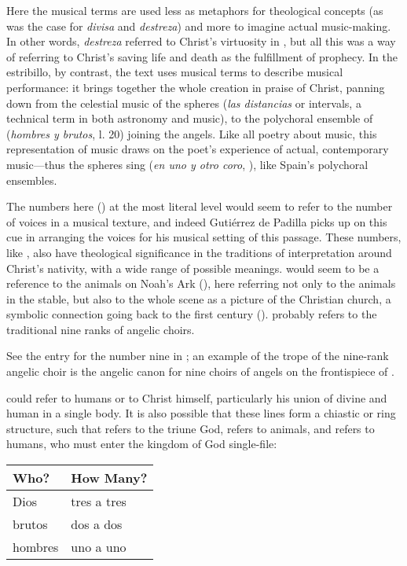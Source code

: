Here the musical terms are used less as metaphors for theological concepts (as
was the case for \emph{divisa} and \emph{destreza}) and more to imagine actual
music-making.
In other words, \emph{destreza} referred to Christ's virtuosity in
, but all this was a way of
referring to Christ's saving life and death as the fulfillment of prophecy.
In the estribillo, by contrast, the text uses musical terms to describe musical
performance: it brings together the whole creation in praise of Christ, panning
down from the celestial music of the spheres (\emph{las distancias} or
intervals, a technical term in both astronomy and music), to the polychoral
ensemble of  (\emph{hombres y brutos}, l. 20) joining the
angels.
Like all poetry about music, this representation of music draws on the poet's
experience of actual, contemporary music---thus the spheres sing  (\emph{en uno y otro coro}, ), like Spain's
polychoral ensembles.

The numbers here () at the most
literal level would seem to refer to the number of voices in a musical texture,
and indeed Gutiérrez de Padilla picks up on this cue in arranging the voices for
his musical setting of this passage.
These numbers, like , also have theological
significance in the traditions of interpretation around Christ's nativity, with
a wide range of possible meanings.
 would seem to be a reference to the animals on Noah's Ark
(), here referring not only to the animals in the stable, but
also to the whole scene as a picture of the Christian church, a symbolic
connection going back to the first century ().%
    \Autocite[15]{Augustine:CivitateDei}
 probably refers to the traditional nine ranks of angelic
choirs.%
    \begin{Footnote}
        See the entry for the number nine in \autocite{Bongo:NumerorumMysteria};
        an example of the trope of the nine-rank angelic choir is the angelic
        canon for nine choirs of angels on the frontispiece of
        \autocite{Kircher:Musurgia}.
    \end{Footnote}
 could refer to humans or to Christ himself, particularly his
union of divine and human in a single body.
It is also possible that these lines form a chiastic or ring structure, such
that  refers to the triune God, 
refers to animals, and  refers to humans, who must enter the
kingdom of God single-file:
\begin{center}
    \begin{tabular}{ll}
        \toprule
        Who?    & How Many? \\
        \midrule
        Dios    & tres a tres \\
        brutos  & dos a dos \\
        hombres & uno a uno \\
        \bottomrule
    \end{tabular}
\end{center}

